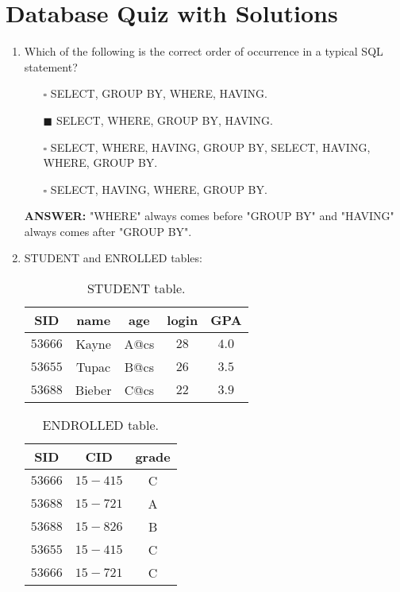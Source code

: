 \documentclass[10pt]{article}
\newcommand{\lightrule}{%
	\arrayrulecolor{black!30}%
	\midrule[\lightrulewidth]%
	\arrayrulecolor{black}}
\begin{document}
	\section{Database Quiz with Solutions}
	\begin{enumerate}
		\item Which of the following is the correct order of occurrence in a typical SQL statement?
			\begin{enumerate}
				\item[$\square$] SELECT, GROUP BY, WHERE, HAVING.
				\item[$\blacksquare$] SELECT, WHERE, GROUP BY, HAVING.
				\item[$\square$] SELECT, WHERE, HAVING, GROUP BY, SELECT, HAVING, WHERE, GROUP BY.
				\item[$\square$] SELECT, HAVING, WHERE, GROUP BY.
			\end{enumerate}
			\color{red} \textbf{ANSWER:} \color{black} "WHERE" always comes before "GROUP BY" and "HAVING" always comes after "GROUP BY".

		\item STUDENT and ENROLLED tables:
			\begin{table}[H]
				\centering
				\begin{tabular}{@{} *{5}{c} @{}}
					\toprule
						\textbf{SID} & \textbf{name} & \textbf{age} & \textbf{login} & \textbf{GPA} \\
					\midrule
						$53666$ & Kayne & A@cs & $28$ & $4.0$ \\ 
					\lightrule
						$53655$ & Tupac & B@cs & $26$ & $3.5$ \\  
					\lightrule
						$53688$ & Bieber & C@cs & $22$ & $3.9$ \\ 
					\bottomrule
				\end{tabular}
				\caption{STUDENT table.}
			\end{table}

			\begin{table}[H]
				\centering
				\begin{tabular}{@{} *{3}{c} @{}}
					\toprule
						\textbf{SID} & \textbf{CID} & \textbf{grade} \\
					\midrule
						$53666$ & $15-415$ & C \\ 
					\lightrule
						$53688$ & $15-721$ & A \\  
					\lightrule
						$53688$ & $15-826$ & B \\
					\lightrule 
						$53655$ & $15-415$ & C \\ 
					\lightrule 
						$53666$ & $15-721$ & C \\ 
					\bottomrule
				\end{tabular}
				\caption{ENDROLLED table.}
			\end{table}
		

\end{enumerate}
\end{document}
